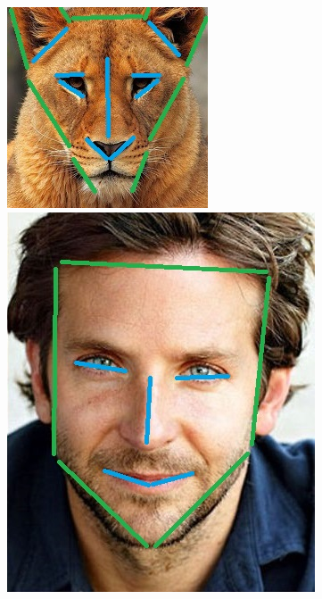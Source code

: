 \documentclass[conference]{IEEEtran}
\begin{document}
\begin{figure}[H]
\begin{multicols}{2}
    \centering
    \includegraphics[width=0.98\linewidth]{cats/1 lines.jpg} \par
    \includegraphics[width=0.98\linewidth]{faces/1 lines.jpg} \par

\end{multicols}
\end{figure}
\end{document}
